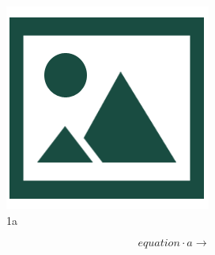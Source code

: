 \documentclass[12pt]{article}
\begin{document}
\begin{figure}[htb]
\includegraphics[width=.8\linewidth]{img/dummy}	
\caption{1a}
\label{fig:fig2}
\end{figure}


\[ equation \cdot a \rightarrow \]
\end{document}
